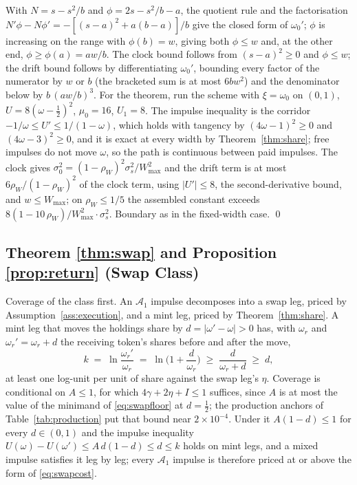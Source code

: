 \documentclass[11pt,a4paper]{article}
\theoremstyle{definition}
\theoremstyle{plain}
\theoremstyle{remark}
\begin{document}
With $N = s - s^2/b$ and $\phi = 2s - s^2/b - a$, the quotient rule and the factorisation $N'\phi - N\phi' = -[(s-a)^2 + a(b-a)]/b$ give the closed form of $\omega_0'$; $\phi$ is increasing on the range
with $\phi(b) = w$, giving both $\phi \le w$ and, at the other end, $\phi \ge \phi(a) = a w/b$. The clock bound follows from $(s - a)^2\ge 0$ and $\phi \le w$; the drift bound follows by differentiating
$\omega_0'$, bounding every factor of the numerator by $w$ or $b$ (the bracketed sum is at most $6 b w^2$) and the denominator below by $b\,(a w/b)^3$. For the theorem, run the scheme with $\xi =
\omega_0$ on $(0,1)$, $U = 8(\omega - \tfrac12)^2$, $\mu_0 = 16$, $U_1 = 8$. The impulse inequality is the corridor $-1/\omega \le U'\le 1/(1 - \omega)$, which holds with tangency by $(4\omega - 1)^2
\ge 0$ and $(4\omega - 3)^2 \ge 0$, and it is exact at every width by Theorem~\ref{thm:share}; free impulses do not move $\omega$, so the path is continuous between paid impulses. The clock gives
$\sigma_0^2 = (1 - \rho_W)^2 \sigma_s^2 / W_{\max}^2$ and the drift term is at most $6\rho_W/(1 - \rho_W)^2$ of the clock term, using $|U'| \le 8$, the second-derivative bound, and $w \le
W_{\max}$; on $\rho_W \le 1/5$ the assembled constant exceeds $8(1 - 10\,\rho_W)/W_{\max}^2 \cdot \sigma_s^2$. Boundary as in the fixed-width case. \qed

\subsection{Theorem \ref{thm:swap} and Proposition \ref{prop:return}
(Swap Class)}

Coverage of the class first. An $\mathcal{A}_1$ impulse decomposes into a swap leg, priced by Assumption~\ref{ass:execution}, and a mint leg, priced by Theorem~\ref{thm:share}. A mint leg that moves
the holdings share by $d = |\omega' - \omega| > 0$ has, with $\omega_r$ and $\omega_r' = \omega_r + d$ the receiving token's shares before and after the move,
\[
k \;=\; \ln \frac{\omega_r'}{\omega_r}
\;=\; \ln\Big(1 + \frac{d}{\omega_r}\Big)
\;\ge\; \frac{d}{\omega_r + d} \;\ge\; d,
\]
at least one log-unit per unit of share against the swap leg's $\eta$. Coverage is conditional on $A \le 1$, for which $4\gamma + 2\eta + I \le 1$ suffices, since $A$ is at most the value of the
minimand of \eqref{eq:swapfloor} at $d = \tfrac12$; the production anchors of Table~\ref{tab:production} put that bound near $2 \times10^{-4}$. Under it $A(1-d) \le 1$ for every $d \in (0,1)$ and the
impulse inequality $U(\omega) - U(\omega') \le A\,d(1-d) \le d \le k$ holds on mint legs, and a mixed impulse satisfies it leg by leg; every $\mathcal{A}_1$ impulse is therefore priced at or above the form of
\eqref{eq:swapcost}.
\end{document}
